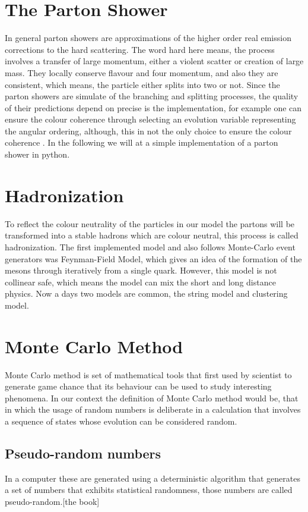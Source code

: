 \section{The Parton Shower}
In general parton showers are approximations of the higher order real emission corrections to the hard scattering. The word hard here means, the process involves a transfer of large momentum, either a violent scatter or creation of large mass. They locally conserve flavour and four momentum, and also they are consistent, which means, the particle either splits into two or not. 
Since the parton showers are simulate of the branching and splitting processes, the quality of their predictions depend on precise is the implementation, for example one can ensure the colour coherence through selecting an evolution variable representing the angular ordering, although, this in not the only choice to ensure the colour coherence \citep{introduction}. In the following we will at a simple implementation of a parton shower in python.   
\section{Hadronization}  

To reflect the colour neutrality of the particles in our model the partons will be transformed into a stable hadrons which are colour neutral, this process is called hadronization. The first implemented model and also follows Monte-Carlo event generators was Feynman-Field Model, which gives an idea of the formation of the mesons through iteratively from a single quark. However, this model is not collinear safe, which means the model can mix the short and long distance physics. Now a days two models are common, the string model and clustering model\citep{introduction}. 
     
      
\section{Monte Carlo Method}
Monte Carlo method is set of mathematical tools that first used by scientist to generate game chance that its behaviour can be used to study interesting phenomena. In our context the definition of Monte Carlo method would be, that in which the usage of random numbers is deliberate in a calculation that involves a sequence of states whose  evolution can be considered random\citep{introduction}. 
\subsection{Pseudo-random numbers}
In a computer these are generated using a deterministic algorithm that generates a set of numbers that exhibits statistical randomness, those numbers are called pseudo-random.[the book] 

